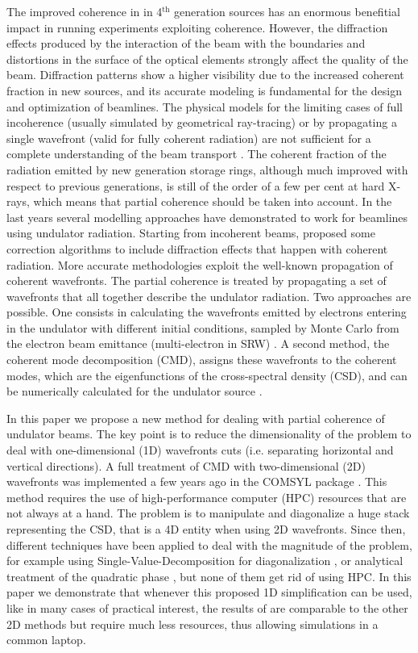 \documentclass{iucr}              %
\begin{document}
The improved coherence in in 4$^{\text{th}}$ generation sources has an enormous benefitial impact in running experiments exploiting coherence. However, the diffraction effects produced by the interaction of the beam with the boundaries and distortions in the surface of the optical elements strongly affect the quality of the beam. Diffraction patterns show a higher visibility due to the increased coherent fraction in new sources, and its accurate modeling is fundamental for the design and optimization of beamlines. The physical models for the limiting cases of full incoherence (usually simulated by geometrical ray-tracing) or by propagating a single wavefront (valid for fully coherent radiation) are not sufficient for a complete understanding of the beam transport \cite{hierarchical}. The coherent fraction of the radiation emitted by new generation storage rings, although much improved with respect to previous generations, is still of the order of a few per cent at hard X-rays, which means that partial coherence should be taken into account. In the last years several modelling approaches have demonstrated to work for beamlines using undulator radiation. Starting from incoherent beams,  proposed some correction algorithms to include diffraction effects that happen with coherent radiation. More accurate methodologies exploit the well-known propagation of coherent wavefronts. The partial coherence is treated by propagating a set of wavefronts that all together describe the undulator radiation. Two approaches are possible. One consists in calculating the wavefronts emitted by electrons entering in the undulator with different initial conditions, sampled by Monte Carlo from the electron beam emittance (multi-electron in SRW) \cite{codeSRW_ME}. A second method, the coherent mode decomposition (CMD), assigns these wavefronts to the coherent modes, which are the eigenfunctions of the cross-spectral density (CSD), and can be numerically calculated for the undulator source \cite{glass2017}.  


In this paper we propose a new method for dealing with partial coherence of undulator beams. The key point is to reduce the dimensionality of the problem to deal with one-dimensional (1D) wavefronts cuts (i.e. separating horizontal and vertical directions). A full treatment of CMD with two-dimensional (2D) wavefronts was implemented a few years ago in the COMSYL package \cite{codeCOMSYL}. This method requires the use of high-performance computer (HPC) resources that are not always at a hand. The problem is to manipulate and diagonalize a huge stack representing the CSD, that is a 4D entity when using 2D wavefronts. Since then, different techniques have been applied to deal with the magnitude of the problem, for example using Single-Value-Decomposition for diagonalization \cite{SVDHanXu}, or analytical treatment of the quadratic phase \cite{ChubarCMD2022}, but none of them get rid of using HPC. In this paper we demonstrate that whenever this proposed 1D simplification can be used, like in many cases of practical interest, the results of are comparable to the other 2D methods but require much less resources, thus allowing simulations in a common laptop. 
\end{document}
